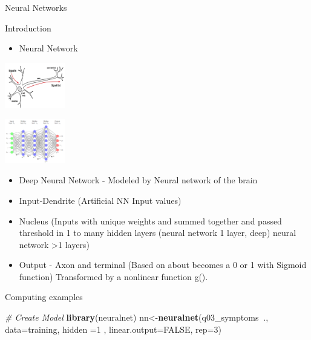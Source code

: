 \documentclass[ignorenonframetext,]{beamer}
\newenvironment{Shaded}{\begin{snugshade}}{\end{snugshade}}
\newcommand{\KeywordTok}[1]{\textcolor[rgb]{0.13,0.29,0.53}{\textbf{#1}}}
\newcommand{\DataTypeTok}[1]{\textcolor[rgb]{0.13,0.29,0.53}{#1}}
\newcommand{\DecValTok}[1]{\textcolor[rgb]{0.00,0.00,0.81}{#1}}
\newcommand{\CommentTok}[1]{\textcolor[rgb]{0.56,0.35,0.01}{\textit{#1}}}
\newcommand{\OtherTok}[1]{\textcolor[rgb]{0.56,0.35,0.01}{#1}}
\newcommand{\OperatorTok}[1]{\textcolor[rgb]{0.81,0.36,0.00}{\textbf{#1}}}
\newcommand{\NormalTok}[1]{#1}
\providecommand{\tightlist}{%
  \setlength{\itemsep}{0pt}\setlength{\parskip}{0pt}}
\begin{document}
\begin{frame}[fragile]{Neural Networks}

\begin{block}{Introduction}

\begin{itemize}
\tightlist
\item
  Neural Network
\end{itemize}

\begin{center}\includegraphics[width=100px]{syn} \end{center}

\begin{center}\includegraphics[width=100px]{deep_nn} \end{center}

\begin{itemize}
\tightlist
\item
  Deep Neural Network - Modeled by Neural network of the brain
\item
  Input-Dendrite (Artificial NN Input values)
\item
  Nucleus (Inputs with unique weights and summed together and passed
  threshold in 1 to many hidden layers (neural network 1 layer, deep)
  neural network \textgreater{}1 layers)
\item
  Output - Axon and terminal (Based on about becomes a 0 or 1 with
  Sigmoid function) Transformed by a nonlinear function g().
\end{itemize}

\end{block}

\begin{block}{Computing examples}

\begin{Shaded}
\begin{Highlighting}[]
\CommentTok{# Create Model}
\KeywordTok{library}\NormalTok{(neuralnet)}
\NormalTok{nn<-}\KeywordTok{neuralnet}\NormalTok{(q03_symptoms}\OperatorTok{~}\NormalTok{., }\DataTypeTok{data=}\NormalTok{training, }\DataTypeTok{hidden =}\DecValTok{1}\NormalTok{ , }\DataTypeTok{linear.output=}\OtherTok{FALSE}\NormalTok{, }\DataTypeTok{rep=}\DecValTok{3}\NormalTok{) }
\end{Highlighting}
\end{Shaded}


\end{block}
\end{frame}
\end{document}
